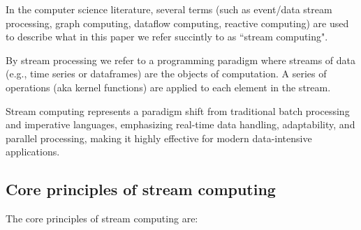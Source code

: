 \documentclass[11pt, reqno]{amsart}
\theoremstyle{definition}
\theoremstyle{remark}
\begin{document}
In the computer science literature, several terms (such as event/data stream
processing, graph computing, dataflow computing, reactive computing) are used
to describe what in this paper we refer succintly to as ``stream computing".

By stream processing we refer to a programming paradigm where streams of data
(e.g., time series or dataframes) are the objects of computation.
A series of operations (aka kernel functions) are applied to each element in
the stream.

Stream computing represents a paradigm shift from traditional batch processing
and imperative languages, emphasizing real-time data handling, adaptability,
and parallel processing, making it highly effective for modern data-intensive
applications.

\subsection{Core principles of stream computing}

The core principles of stream computing are:
\end{document}
